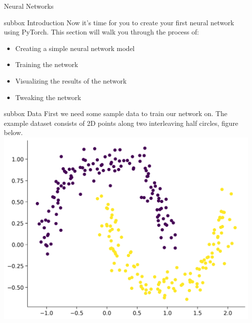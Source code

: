 
\begin{multicols}{3}
\begin{textbox}{Neural Networks}
\begin{subbox}{subbox}{ Introduction}
\scriptsize
Now it’s time for you to create your first neural network using PyTorch. This section will walk you through the process of:
\begin{itemize}
    \item 
Creating a simple neural network model
    \item Training the network
    \item Visualizing the results of the network
    \item Tweaking the network
\end{itemize}
\end{subbox}
\begin{subbox}{subbox}{ Data }
\scriptsize
First we need some sample data to train our network on. The example dataset consists of 2D points along two interleaving half circles, figure below. 
\centering
\includegraphics[scale=0.3]{Figures/NN/NNFigure1.png}


\end{subbox}

\end{textbox}
\end{multicols}
